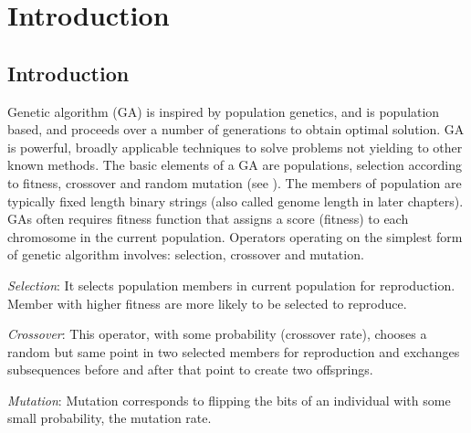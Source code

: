 \chapter{Introduction} \label{ch:introduction}
\section{Introduction}
Genetic algorithm (GA) is inspired by population genetics, and is population based, and 
proceeds over a number of generations to obtain optimal solution. GA is powerful, broadly applicable 
techniques to solve problems not yielding to other known methods. The basic elements of a GA are
populations, selection according to fitness, crossover and random mutation (see \cite{Mitchell1999}). 
The members of population are typically fixed length binary strings (also called genome length in later chapters).  
GAs often requires fitness function that assigns a score (fitness) to each chromosome 
in the current population. Operators operating on the simplest form of genetic algorithm involves: selection, crossover and mutation.

\textit{Selection}: It selects population members in current population for reproduction. 
Member with higher fitness are more likely to be selected to reproduce.

\textit{Crossover}: This operator, with some probability (crossover rate), chooses a random but same point in two selected members for reproduction 
and exchanges subsequences before and after that point to create two offsprings.

\textit{Mutation}: Mutation corresponds to flipping the bits of an individual with some small probability, 
the mutation rate.

